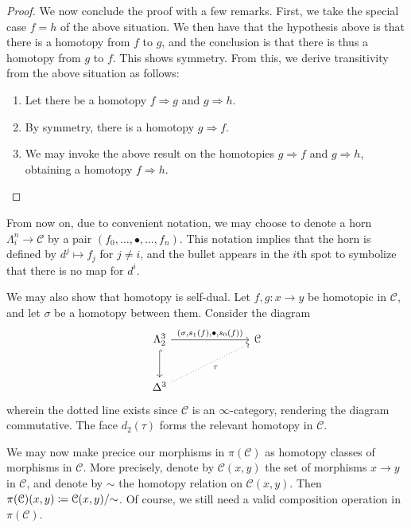 \begin{proof}
	We now conclude the proof with a few remarks. First, we take the special case $f=h$ of the above situation. We then have that the hypothesis above is that there is a homotopy from $f$ to $g$, and the conclusion is that there is thus a homotopy from $g$ to $f$. This shows symmetry. From this, we derive transitivity from the above situation as follows:
	\begin{enumerate}
	\item Let there be a homotopy $f \Rightarrow g$ and $g \Rightarrow h$.
	\item By symmetry, there is a homotopy $g\Rightarrow f$.
	\item We may invoke the above result on the homotopies $g\Rightarrow f$ and $g\Rightarrow h$, obtaining a homotopy $f\Rightarrow h$.
	\end{enumerate}
\end{proof}

\begin{notation}
	From now on, due to convenient notation, we may choose to denote a horn $\Lambda _i^n \to \mathcal{C} $ by a pair $(f_0, \ldots ,\bullet, \ldots ,f_n)$. This notation implies that the horn is defined by $d^j \mapsto f_j$ for $j\neq i$, and the bullet appears in the $i$th spot to symbolize that there is no map for $d^i$.
\end{notation}


\begin{remark}\label{1.2.3.8}
	We may also show that homotopy is self-dual. Let $f,g : x \to y$ be homotopic in $\mathcal{C} $, and let $\sigma $ be a homotopy between them. Consider the diagram
	\[\begin{tikzcd}[row sep = 2.5em, column sep = 7em]
	\Lambda _2^3 \ar[" (\sigma \text{,} s_1(f)\text{,} \bullet\text{,} s_0(f)) ", r] \ar[hook, d]  & \mathcal{C}  \\
	\Delta ^3 \ar[" \tau  "', dotted, ur]  & 
	\end{tikzcd}\]
	wherein the dotted line exists since $\mathcal{C} $ is an $\infty $-category, rendering the diagram commutative. The face $d_2(\tau )$ forms the relevant homotopy in $\mathcal{C} $.
\end{remark}

We may now make precice our morphisms in $\pi (\mathcal{C} )$ as homotopy classes of morphisms in $\mathcal{C} $. More precisely, denote by $\mathcal{C} (x,y)$ the set of morphisms $x\to y$ in $\mathcal{C} $, and denote by $\sim $ the homotopy relation on $\mathcal{C} (x,y)$. Then $\pi (\mathcal{C} )(x,y)\coloneqq \mathcal{C} (x,y) /\mathbin{\sim} $. Of course, we still need a valid composition operation in $\pi (\mathcal{C} )$.

